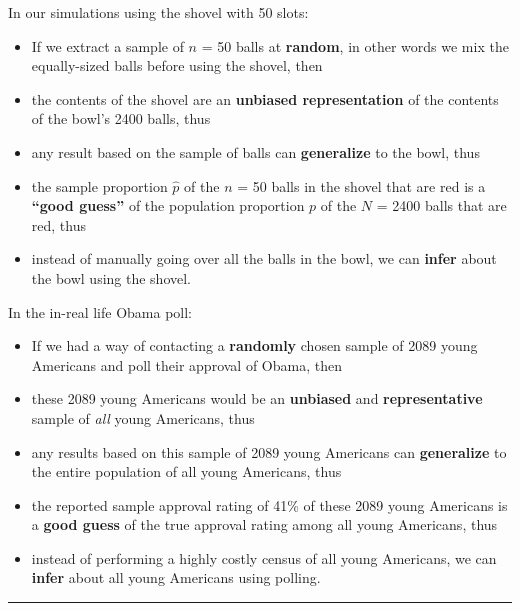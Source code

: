 \documentclass[12pt, krantz2,]{krantz}
\providecommand{\tightlist}{%
  \setlength{\itemsep}{0pt}\setlength{\parskip}{0pt}}
\renewenvironment{quote}{\begin{VF}}{\end{VF}}
\begin{document}
In our simulations using the shovel with 50 slots:

\begin{quote}
\begin{itemize}
\tightlist
\item
  If we extract a sample of \(n\) = 50 balls at \textbf{random}, in other words we mix the equally-sized balls before using the shovel, then
\item
  the contents of the shovel are an \textbf{unbiased representation} of the contents of the bowl's 2400 balls, thus
\item
  any result based on the sample of balls can \textbf{generalize} to the bowl, thus
\item
  the sample proportion \(\widehat{p}\) of the \(n\) = 50 balls in the shovel that are red is a \textbf{``good guess''} of the population proportion \(p\) of the \(N\) = 2400 balls that are red, thus
\item
  instead of manually going over all the balls in the bowl, we can \textbf{infer} about the bowl using the shovel.
\end{itemize}
\end{quote}

In the in-real life Obama poll:

\begin{quote}
\begin{itemize}
\tightlist
\item
  If we had a way of contacting a \textbf{randomly} chosen sample of 2089 young Americans and poll their approval of Obama, then
\item
  these 2089 young Americans would be an \textbf{unbiased} and \textbf{representative} sample of \emph{all} young Americans, thus
\item
  any results based on this sample of 2089 young Americans can \textbf{generalize} to the entire population of all young Americans, thus
\item
  the reported sample approval rating of 41\% of these 2089 young Americans is a \textbf{good guess} of the true approval rating among all young Americans, thus
\item
  instead of performing a highly costly census of all young Americans, we can \textbf{infer} about all young Americans using polling.
\end{itemize}
\end{quote}

\begin{center}\rule{0.5\linewidth}{\linethickness}\end{center}
\end{document}
